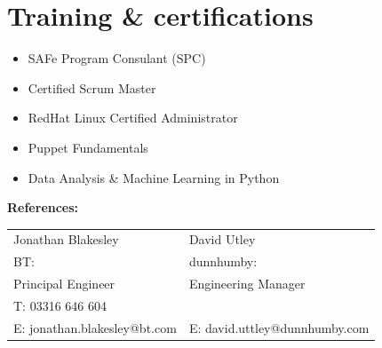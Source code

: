\documentclass[]{cv-style}          %
\begin{document}
\section{Training \& certifications}
  \vspace{-0.2cm}
\begin{itemize}
  \item{SAFe Program Consulant (SPC)}
  \item{Certified Scrum Master}
  \item{RedHat Linux Certified Administrator}
  \item{Puppet Fundamentals}
  \item{Data Analysis \& Machine Learning in Python}
\end{itemize}



\textbf{References:}\\
\begin{center}
  \begin{tabular}{ |l|l| }
    \hline
    Jonathan Blakesley & David Utley\\
    BT: & dunnhumby:\\
    Principal Engineer & Engineering Manager\\
    T: 03316 646 604 &  &  \\
    E: jonathan.blakesley@bt.com & E: david.uttley@dunnhumby.com\\
    \hline
  \end{tabular}
\end{center}
\end{document}
